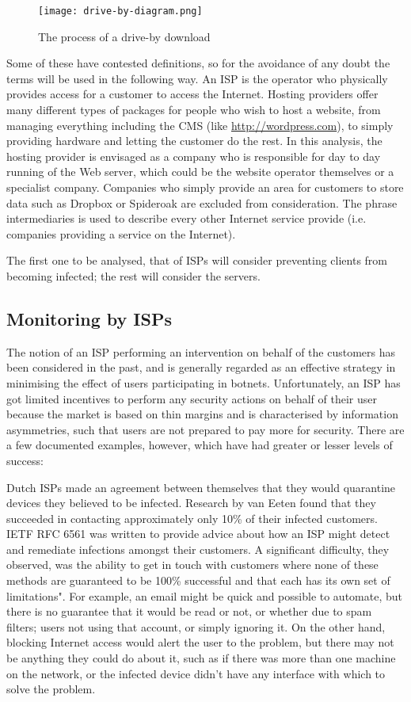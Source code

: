 \documentclass{acm_proc_article-sp}
\begin{document}
\begin{figure}
\centering
       \texttt{[image: drive-by-diagram.png]}
       \caption{The process of a drive-by download}
       \label{fig:drive-by}
\end{figure}

Some of these have contested definitions, so for the avoidance of any doubt the terms will be used in the following way.  An ISP is the operator who physically provides access for a customer to access the Internet.  Hosting providers offer many different types of packages for people who wish to host a website, from managing everything including the CMS (like \url{http://wordpress.com}), to simply providing hardware and letting the customer do the rest.  In this analysis, the hosting provider is envisaged as a company who is responsible for day to day running of the Web server, which could be the website operator themselves or a specialist company.  Companies who simply provide an area for customers to store data such as Dropbox or Spideroak are excluded from consideration.  The phrase intermediaries is used to describe every other Internet service provide (i.e. companies providing a service on the Internet).

The first one to be analysed, that of ISPs will consider preventing clients from becoming infected; the rest will consider the servers.

\subsection{Monitoring by ISPs}
The notion of an ISP performing an intervention on behalf of the customers has been considered in the past, and is generally regarded as an effective strategy in minimising the effect of users participating in botnets.  Unfortunately, an ISP has got limited incentives to perform any security actions on behalf of their user because the market is based on thin margins and is characterised by information asymmetries, such that users are not prepared to pay more for security\cite{clayton}.  There are a few documented examples, however, which have had greater or lesser levels of success:

Dutch ISPs made an agreement between themselves that they would quarantine devices they believed to be infected.  Research by van Eeten found that they succeeded in contacting approximately only 10\% of their infected customers.  IETF RFC 6561 was written to provide advice about how an ISP might detect and remediate infections amongst their customers.  A significant difficulty, they observed, was the ability to get in touch with customers where none of these methods are guaranteed to be 100\% successful and that each has its own set of limitations".  For example, an email might be quick and possible to automate, but there is no guarantee that it would be read or not, or whether due to spam filters; users not using that account, or simply ignoring it.  On the other hand, blocking Internet access would alert the user to the problem, but there may not be anything they could do about it, such as if there was more than one machine on the network, or the infected device didn't have any interface with which to solve the problem.
\end{document}
